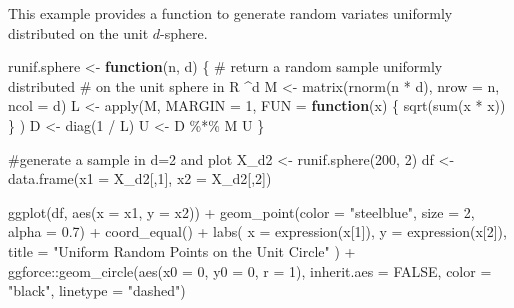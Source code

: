 \documentclass[
  letterpaper,
  DIV=11,
  numbers=noendperiod]{scrreprt}
\newenvironment{Shaded}{\begin{snugshade}}{\end{snugshade}}
\newcommand{\AttributeTok}[1]{\textcolor[rgb]{0.40,0.45,0.13}{#1}}
\newcommand{\CommentTok}[1]{\textcolor[rgb]{0.37,0.37,0.37}{#1}}
\newcommand{\ConstantTok}[1]{\textcolor[rgb]{0.56,0.35,0.01}{#1}}
\newcommand{\ControlFlowTok}[1]{\textcolor[rgb]{0.00,0.23,0.31}{\textbf{#1}}}
\newcommand{\DecValTok}[1]{\textcolor[rgb]{0.68,0.00,0.00}{#1}}
\newcommand{\FloatTok}[1]{\textcolor[rgb]{0.68,0.00,0.00}{#1}}
\newcommand{\FunctionTok}[1]{\textcolor[rgb]{0.28,0.35,0.67}{#1}}
\newcommand{\NormalTok}[1]{\textcolor[rgb]{0.00,0.23,0.31}{#1}}
\newcommand{\OtherTok}[1]{\textcolor[rgb]{0.00,0.23,0.31}{#1}}
\newcommand{\SpecialCharTok}[1]{\textcolor[rgb]{0.37,0.37,0.37}{#1}}
\newcommand{\StringTok}[1]{\textcolor[rgb]{0.13,0.47,0.30}{#1}}
\begin{document}
This example provides a function to generate random variates uniformly
distributed on the unit \(d\)-sphere.

\begin{Shaded}
\begin{Highlighting}[]
\NormalTok{runif.sphere }\OtherTok{\textless{}{-}} \ControlFlowTok{function}\NormalTok{(n, d) \{}
  \CommentTok{\# return a random sample uniformly distributed}
  \CommentTok{\# on the unit sphere in R \^{}d}
\NormalTok{  M }\OtherTok{\textless{}{-}} \FunctionTok{matrix}\NormalTok{(}\FunctionTok{rnorm}\NormalTok{(n }\SpecialCharTok{*}\NormalTok{ d), }\AttributeTok{nrow =}\NormalTok{ n, }\AttributeTok{ncol =}\NormalTok{ d)}
\NormalTok{  L }\OtherTok{\textless{}{-}} \FunctionTok{apply}\NormalTok{(M,}
    \AttributeTok{MARGIN =} \DecValTok{1}\NormalTok{,}
    \AttributeTok{FUN =} \ControlFlowTok{function}\NormalTok{(x) \{}
      \FunctionTok{sqrt}\NormalTok{(}\FunctionTok{sum}\NormalTok{(x }\SpecialCharTok{*}\NormalTok{ x))}
\NormalTok{    \}}
\NormalTok{  )}
\NormalTok{  D }\OtherTok{\textless{}{-}} \FunctionTok{diag}\NormalTok{(}\DecValTok{1} \SpecialCharTok{/}\NormalTok{ L)}
\NormalTok{  U }\OtherTok{\textless{}{-}}\NormalTok{ D }\SpecialCharTok{\%*\%}\NormalTok{ M}
\NormalTok{  U}
\NormalTok{\}}

\CommentTok{\#generate a sample in d=2 and plot}
\NormalTok{X\_d2 }\OtherTok{\textless{}{-}} \FunctionTok{runif.sphere}\NormalTok{(}\DecValTok{200}\NormalTok{, }\DecValTok{2}\NormalTok{)}
\NormalTok{df }\OtherTok{\textless{}{-}} \FunctionTok{data.frame}\NormalTok{(}\AttributeTok{x1 =}\NormalTok{ X\_d2[,}\DecValTok{1}\NormalTok{], }\AttributeTok{x2 =}\NormalTok{ X\_d2[,}\DecValTok{2}\NormalTok{])}

\FunctionTok{ggplot}\NormalTok{(df, }\FunctionTok{aes}\NormalTok{(}\AttributeTok{x =}\NormalTok{ x1, }\AttributeTok{y =}\NormalTok{ x2)) }\SpecialCharTok{+}
  \FunctionTok{geom\_point}\NormalTok{(}\AttributeTok{color =} \StringTok{"steelblue"}\NormalTok{, }\AttributeTok{size =} \DecValTok{2}\NormalTok{, }\AttributeTok{alpha =} \FloatTok{0.7}\NormalTok{) }\SpecialCharTok{+}
  \FunctionTok{coord\_equal}\NormalTok{() }\SpecialCharTok{+}                     
  \FunctionTok{labs}\NormalTok{(}
    \AttributeTok{x =} \FunctionTok{expression}\NormalTok{(x[}\DecValTok{1}\NormalTok{]),}
    \AttributeTok{y =} \FunctionTok{expression}\NormalTok{(x[}\DecValTok{2}\NormalTok{]),}
    \AttributeTok{title =} \StringTok{"Uniform Random Points on the Unit Circle"}
\NormalTok{  ) }\SpecialCharTok{+}
\NormalTok{  ggforce}\SpecialCharTok{::}\FunctionTok{geom\_circle}\NormalTok{(}\FunctionTok{aes}\NormalTok{(}\AttributeTok{x0 =} \DecValTok{0}\NormalTok{, }\AttributeTok{y0 =} \DecValTok{0}\NormalTok{, }\AttributeTok{r =} \DecValTok{1}\NormalTok{), }\AttributeTok{inherit.aes =} \ConstantTok{FALSE}\NormalTok{,}
              \AttributeTok{color =} \StringTok{"black"}\NormalTok{, }\AttributeTok{linetype =} \StringTok{"dashed"}\NormalTok{)}
\end{Highlighting}
\end{Shaded}
\end{document}
